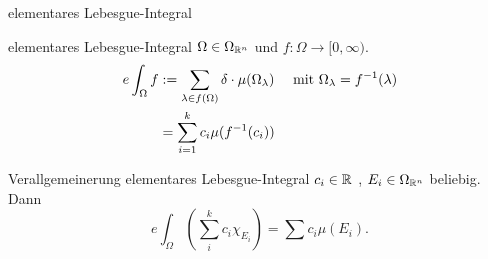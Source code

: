 \documentclass[class=article, crop=false]{standalone}
\begin{document}
\begin{zettel}{elementares Lebesgue-Integral}
\begin{flashcard}[e3tf5t7v]{elementares Lebesgue-Integral}
	$\Omega \in  \Omega_{\mathbb{R}^n}$ und $f: \Omega \to  [0, \infty)$.
	\begin{align*}
		e \int_{\Omega} f & := \sum_{\lambda \in  f(\Omega)} \delta \cdot \mu(\Omega_\lambda ) \quad \text{ mit } \Omega_{\lambda} = f^{-1}(\lambda) \\
		                  & = \sum_{i = 1}^{k} c_i \mu ( f^{-1}(c_i))
	\end{align*}
\end{flashcard}

\begin{flashcard}[1rwb09r5]{Verallgemeinerung elementares Lebesgue-Integral}
	$c_i \in  \mathbb{R} $ , $E_i \in  \Omega_{\mathbb{R}^n}$ beliebig. Dann
	\[
		e \int_{\Omega} \left(\sum_{i}^{k} c_i \chi_{E_i}\right) = \sum c_i \mu(E_i)
	.\]
\end{flashcard}

\begin{lemma}
\end{lemma}

\end{zettel}
\end{document}
